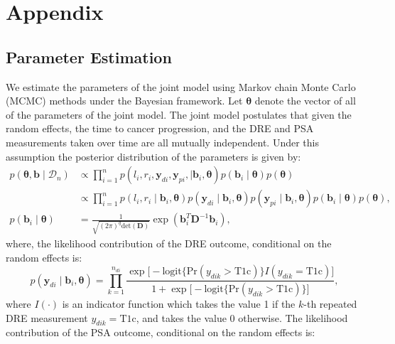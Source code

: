 \section*{Appendix}

\begin{subappendices}
\section{Parameter Estimation}
\label{c3:appendix:A}
We estimate the parameters of the joint model using Markov chain Monte Carlo (MCMC) methods under the Bayesian framework. Let $\boldsymbol{\theta}$ denote the vector of all of the parameters of the joint model. The joint model postulates that given the random effects, the time to cancer progression, and the DRE and PSA measurements taken over time are all mutually independent. Under this assumption the posterior distribution of the parameters is given by:
\begin{align*}
p(\boldsymbol{\theta}, \boldsymbol{b} \mid \mathcal{D}_n) & \propto \prod_{i=1}^n p(l_i, r_i, \boldsymbol{y}_{di}, \boldsymbol{y}_{pi}, \mid \boldsymbol{b}_i, \boldsymbol{\theta}) p(\boldsymbol{b}_i \mid \boldsymbol{\theta}) p(\boldsymbol{\theta})\\
& \propto \prod_{i=1}^n p(l_i, r_i \mid \boldsymbol{b}_i, \boldsymbol{\theta}) p(\boldsymbol{y}_{di} \mid \boldsymbol{b}_i, \boldsymbol{\theta}) p(\boldsymbol{y}_{pi} \mid \boldsymbol{b}_i, \boldsymbol{\theta}) p(\boldsymbol{b}_i \mid \boldsymbol{\theta}) p(\boldsymbol{\theta}),\\
p(\boldsymbol{b}_i \mid \boldsymbol{\theta}) &= \frac{1}{\sqrt{(2 \pi)^q \text{det}(\boldsymbol{D})}} \exp(\boldsymbol{b}_i^T \boldsymbol{D}^{-1} \boldsymbol{b}_i),
\end{align*}
where, the likelihood contribution of the DRE outcome, conditional on the random effects is:
\begin{equation*}
p(\boldsymbol{y}_{di} \mid \boldsymbol{b}_i, \boldsymbol{\theta}) = \prod_{k=1}^{n_{di}} \frac{\exp\Big[-\mbox{logit} \big\{\mbox{Pr}(y_{dik} > \mbox{T1c})\big\} I(y_{dik}=\mbox{T1c}) \Big]}  {1+\exp\Big[-\mbox{logit} \big\{\mbox{Pr}(y_{dik} > \mbox{T1c})\big\}\Big]},
\end{equation*}
where $I(\cdot)$ is an indicator function which takes the value 1 if the $k$-th repeated DRE measurement ${y_{dik}=\mbox{T1c}}$, and takes the value 0 otherwise. The likelihood contribution of the PSA outcome, conditional on the random effects is:
\begin{equation*}

\end{equation*}
\end{subappendices}

